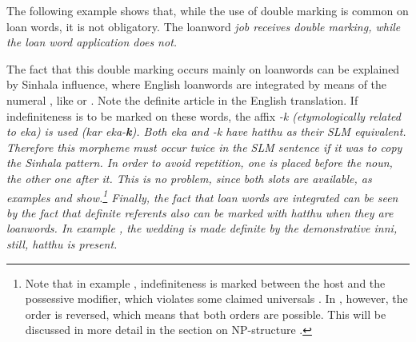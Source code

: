 The following example shows that, while the use of double marking is common on loan words, it is not obligatory. The loanword \em job \em receives double marking, while the loan word \em application \em does not.





The fact that this double marking occurs mainly on loanwords can be explained by Sinhala influence, where English loanwords are integrated by means of the numeral , like  or  \citep{Karunatillake2004}. Note the definite article in the English translation. If indefiniteness is to be marked on these words, the affix \em -k \em (etymologically related to \em eka\em) is used (\em kar eka-\textbf{k}\em). Both \em eka \em and \em -k \em have \em hatthu \em as their SLM equivalent. Therefore this morpheme must occur twice in the SLM sentence if it was to copy the Sinhala pattern.  In order to avoid repetition, one is placed before the noun, the other one after it. This is no problem, since both slots are available, as examples  and 
show.\footnote{Note that in example , indefiniteness is marked between the host and the possessive modifier, which violates some claimed universals \citep{Greenberg1963,Hawkins1994,Rijkhoff2002}. In , however, the order is reversed, which means that both orders are possible. This will be discussed in more detail in the section on NP-structure .}
Finally, the fact that loan words are integrated can be seen by the fact that definite referents also can be marked with \em hatthu \em when they are loanwords. In example , the wedding is made definite by the demonstrative \em inni\em, still, \em hatthu \em is present.

